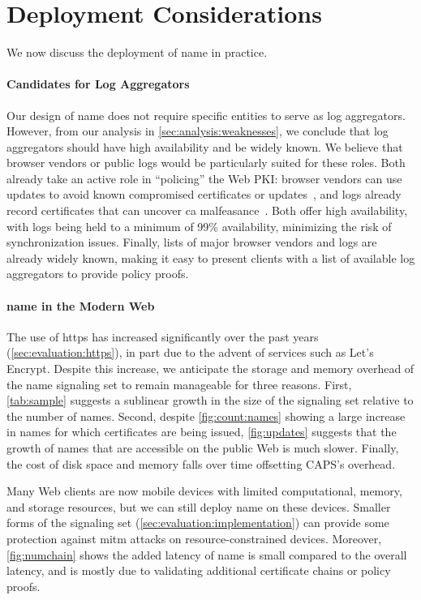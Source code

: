 \section{Deployment Considerations}
\label{sec:discussion}

We now discuss the deployment of \ac{name} in practice. 

\paragraph{Candidates for Log Aggregators}

Our design of \ac{name} does not require specific entities to serve as log
aggregators. However, from our analysis in \autoref{sec:analysis:weaknesses},
we conclude that log aggregators should have high availability and be widely
known. We believe that browser vendors or public logs would be particularly
suited for these roles. Both already take an active role in ``policing'' the
Web PKI: browser vendors can use updates to avoid known compromised
certificates or updates~\cite{langley2012revocation}, and logs already record
certificates that can uncover \ac{ca} malfeasance~\cite{sleevi2015sustaining}.
Both offer high availability, with logs being held to a minimum of 99\%
availability, minimizing the risk of synchronization issues. Finally, lists
of major browser vendors and logs are already widely known, making it easy to
present clients with a list of available log aggregators to provide policy
proofs.

\paragraph{\ac{name} in the Modern Web}

The use of \ac{https} has increased significantly over the past years
(\autoref{sec:evaluation:https}), in part due to the advent of services such as
Let's Encrypt. Despite this increase, we anticipate the 
storage and memory overhead of the \ac{name} signaling set to remain manageable for
three reasons. First, \autoref{tab:sample} suggests a sublinear growth in the
size of the signaling set relative to the number of names. Second, despite
\autoref{fig:count:names} showing a large increase in names for which
certificates are being issued, \autoref{fig:updates} suggests that the growth
of names that are accessible on the public Web is much slower. Finally, the
cost of disk space and memory falls over time offsetting CAPS's overhead.

Many Web clients are now mobile devices with limited
computational, memory, and storage resources, but we can still deploy
\ac{name} on these devices. 
Smaller forms of the signaling set (\autoref{sec:evaluation:implementation}) can
provide some protection against \ac{mitm} attacks on resource-constrained
devices. Moreover, \autoref{fig:numchain} shows the added latency of \ac{name}
is small compared to the overall latency, and is mostly due to validating
additional certificate chains or policy proofs.

